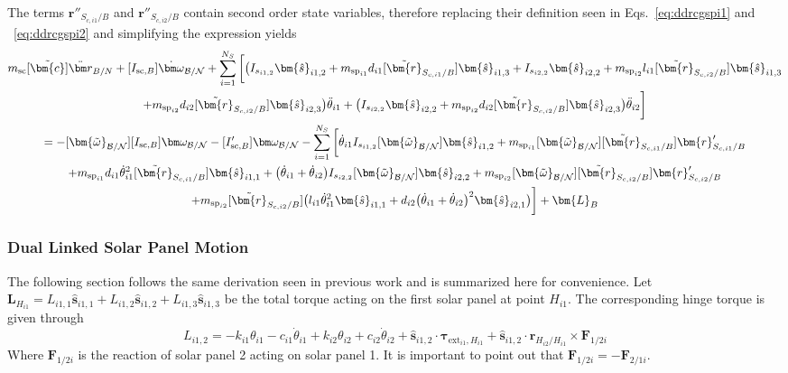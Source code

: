 The terms $\bm{r}''_{S_{c,i1}/B}$ and $\bm{r}''_{S_{c,i2}/B}$ contain second order state variables, therefore replacing their definition seen in Eqs.~\eqref{eq:ddrcgspi1} and ~\eqref{eq:ddrcgspi2} and simplifying the expression yields
\begin{multline}
	m_{\text{sc}} [\tilde{\bm{c}}] \ddot{\bm r}_{B/N} + [I_{\text{sc},B}] \dot{\bm\omega}_{\cal B/N} + \sum\limits_{i=1}^{N_S} \bigg[  \big(I_{s_{i1,2}}\bm{\hat{s}}_{i1,2}+m_{\text{sp}_{i1}}d_{i1} [\tilde{\bm{r}}_{S_{c,i1}/B}]   \bm{\hat{s}}_{i1,3} + I_{s_{i2,2}}\bm{\hat{s}}_{i2,2}
	+m_{\text{sp}_{i2}}l_{i1} [\tilde{\bm{r}}_{S_{c,i2}/B}]  \bm{\hat{s}}_{i1,3}\\
	+m_{\text{sp}_{i2}}d_{i2} [\tilde{\bm{r}}_{S_{c,i2}/B}] \bm{\hat{s}}_{i2,3}\big) \ddot{\theta}_{i1}
	+\big( I_{s_{i2,2}}\bm{\hat{s}}_{i2,2}+m_{\text{sp}_{i2}} d_{i2} [\tilde{\bm{r}}_{S_{c,i2}/B}] \bm{\hat{s}}_{i2,3}\big)\ddot{\theta}_{i2}\bigg]
	\\
	= -[\bm{\tilde{\omega}}_{\cal B/N}] [I_{\text{sc},B}] \bm\omega_{\cal B/N} - [I'_{\text{sc},B}] \bm\omega_{\cal B/N}
	-  \sum\limits_{i=1}^{N_S} \bigg[
	\dot{\theta}_{i1} I_{s_{i1,2}} [\bm{\tilde{\omega}}_{\cal B/N}] \bm{\hat{s}}_{i1,2}
	+m_{\text{sp}_{i1}} [\bm{\tilde{\omega}}_{\cal B/N}] [\tilde{\bm{r}}_{S_{c,i1}/B}] \bm{r}'_{S_{c,i1}/B} \\
	+m_{\text{sp}_{i1}}d_{i1}\dot{\theta}_{i1}^2  [\tilde{\bm{r}}_{S_{c,i1}/B}] \bm{\hat{s}}_{i1,1}
	+ \big(\dot{\theta}_{i1}+\dot{\theta}_{i2}\big) I_{s_{i2,2}}[\bm{\tilde{\omega}}_{\cal B/N}]\bm{\hat{s}}_{i2,2}
	+m_{\text{sp}_{i2}} [\bm{\tilde{\omega}}_{\cal B/N}] [\tilde{\bm{r}}_{S_{c,i2}/B}] \bm{r}'_{S_{c,i2}/B} \\
	+m_{\text{sp}_{i2}} [\tilde{\bm{r}}_{S_{c,i2}/B}] \big(l_{i1} \dot{\theta}_{i1}^2 \bm{\hat{s}}_{i1,1} + d_{i2}\big(\dot{\theta}_{i1} + \dot{\theta}_{i2}\big)^2\bm{\hat{s}}_{i2,1}\big)\bigg]
	+ \bm{L}_B
	\label{eq:Final6}
\end{multline}


\subsubsection{Dual Linked Solar Panel Motion}

The following section follows the same derivation seen in previous work\cite{Allard2016rz} and is summarized here for convenience.
Let $\bm L_{H_{i1}} = L_{i1,1} \hat{\bm s}_{i1,1} + L_{i1,2} \hat{\bm s}_{i1,2} + L_{i1,3} \hat{\bm s}_{i1,3}$ be the total torque acting on the first solar panel at point $H_{i1}$. The corresponding hinge torque is given through
\begin{equation}
	L_{i1,2} = - k_{i1} \theta_{i1} - c_{i1}\dot{\theta}_{i1} +  k_{i2} \theta_{i2} + c_{i2} \dot\theta_{i2} + \hat{\bm s}_{i1,2} \cdot \bm \tau_{\text{ext}_{i1},H_{i1}} + \hat{\bm s}_{i1,2} \cdot \bm{r}_{H_{i2}/H_{i1}} \times \bm F_{1/2i}
	\label{eq:hingeTorque1}
\end{equation}
Where $\bm F_{1/2i}$ is the reaction of solar panel 2 acting on solar panel 1. It is important to point out that $\bm F_{1/2i} = - \bm F_{2/1i}$.

